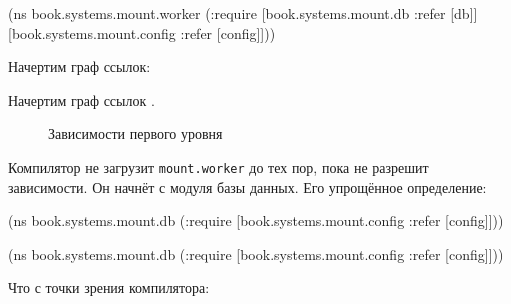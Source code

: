 \else

\begin{english}
  \begin{clojure}
(ns book.systems.mount.worker
  (:require
   [book.systems.mount.db :refer [db]]
   [book.systems.mount.config
     :refer [config]]))
  \end{clojure}
\end{english}

\fi


\ifprint

\noindent
Начертим граф ссылок:

\begin{figure}[h!]
\end{figure}

\fi

\ifebook

\noindent
Начертим граф ссылок .

\begin{figure}[ht!]
  \caption{Зависимости первого уровня}
  \label{fig:chart-sys-2}
\end{figure}

\fi

Компилятор не загрузит \verb|mount.worker| до тех пор, пока не разрешит
зависимости. Он начнёт с модуля базы данных. Его упрощённое определение:

\ifnarrow

\begin{english}
  \begin{clojure}
(ns book.systems.mount.db
  (:require
   [book.systems.mount.config
    :refer [config]]))
  \end{clojure}
\end{english}

\else

\begin{english}
  \begin{clojure}
(ns book.systems.mount.db
  (:require
   [book.systems.mount.config :refer [config]]))
  \end{clojure}
\end{english}

\fi

\ifprint

\noindent
Что с точки зрения компилятора:

\begin{figure}[h!]
\end{figure}

